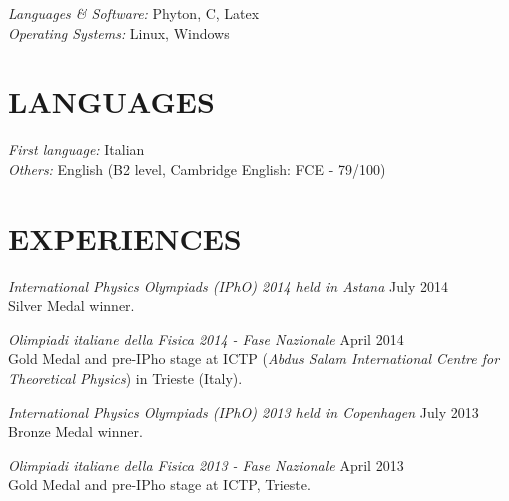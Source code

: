 \documentclass[margin, 10pt]{res} %
\begin{document}
\begin{resume}
{\sl Languages \& Software:} 
Phyton, C, Latex\\
{\sl Operating Systems:} Linux, Windows


\section{LANGUAGES} 

{\sl First language:} Italian\\
{\sl Others:} English (B2 level, Cambridge English: FCE - 79/100)


 
\section{EXPERIENCES}



{\sl International Physics Olympiads (IPhO) 2014 held in Astana} \hfill July 2014\\
Silver Medal winner.

{\sl Olimpiadi italiane della Fisica 2014 - Fase Nazionale} \hfill April 2014\\
Gold Medal and pre-IPho stage at ICTP (\textit{Abdus Salam International Centre for Theoretical Physics}) in Trieste (Italy).

{\sl International Physics Olympiads (IPhO) 2013 held in Copenhagen} \hfill July 2013\\
Bronze Medal winner.

{\sl Olimpiadi italiane della Fisica 2013 - Fase Nazionale} \hfill  April 2013\\
Gold Medal and pre-IPho stage at ICTP, Trieste.


\end{resume}
\end{document}
